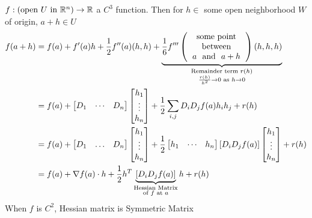 $f:(\text{open }U\text{ in }\mathbb{R}^n )\to \mathbb{R}$ a $C^3$ function. Then  for $h\in $ some  open neighborhood $W$ of origin, $a+h\in U$ \begin{align*}
	f(a+h) & =f(a)+f'(a)h+\frac12f''(a)(h,h)+\underbrace{\frac16f'''\lt(\begin{tabular}{c}
		  \text{some point}    \\
		    \text{between}     \\
		$a$ \text{ and } $a+h$
	\end{tabular}\rt)(h,h,h)}_{\substack{ \text{Remainder term }r(h) \\ \frac{r(h)}{h^2}\to 0 \text{ as }h\to 0}} \\
	& = f(a)+\lt[ \begin{matrix}
		D_1 & \cdots & D_n
	\end{matrix} \rt]\lt[ \begin{matrix}
	h_1\\ \vdots \\ h_n
\end{matrix} \rt]+\frac12 \sum_{i,j}D_iD_jf(a)h_ih_j+r(h)\\
&=  f(a)+\lt[ \begin{matrix}
	D_1 & \dots & D_n
\end{matrix} \rt]\lt[ \begin{matrix}
	h_1\\ \vdots \\ h_n
\end{matrix} \rt] +\frac12 \lt[ \begin{matrix}
h_1& \cdots & h_n
\end{matrix}\rt][D_iD_jf(a)] \lt[ \begin{matrix}
h_1\\ \vdots\\ h_n
\end{matrix} \rt]+r(h)\\
&=f(a)+\nabla f(a)\cdot h+\frac12 h^T \underbrace{[D_iD_jf(a)]}_{\substack{\text{Hessian Matrix}\\ \text{of }f\text{ at }a}}h+r(h)
\end{align*}
When $f$ is $C^2$, Hessian matrix is Symmetric Matrix


